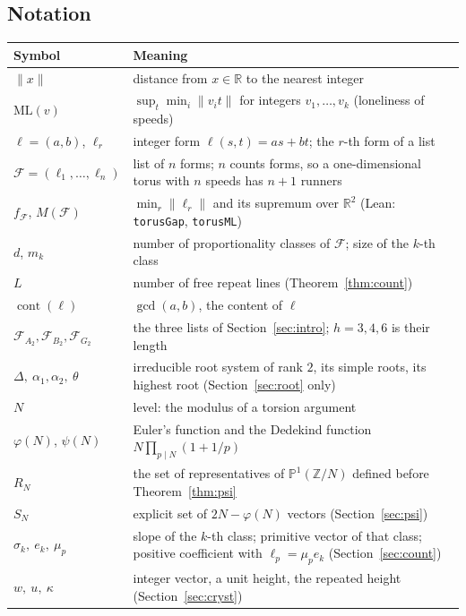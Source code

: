 \documentclass[11pt]{amsart}
\theoremstyle{definition}
\theoremstyle{remark}
\newcommand{\R}{\mathbb{R}}
\newcommand{\Z}{\mathbb{Z}}
\newcommand{\dist}[1]{\lVert #1\rVert}
\newcommand{\ML}{\mathrm{ML}}
\newcommand{\lean}[1]{\texttt{#1}}
\newcommand{\cont}{\operatorname{cont}}
\begin{document}
\subsection{Notation}
\begin{center}
\small
\begin{tabular}{@{}p{3.4cm}p{9cm}@{}}
\toprule
Symbol & Meaning\\
\midrule
$\dist{x}$ & distance from $x\in\R$ to the nearest integer\\
$\ML(v)$ & $\sup_t\min_i\dist{v_it}$ for integers $v_1,\dots,v_k$ (loneliness of speeds)\\
$\ell=(a,b)$, $\ell_r$ & integer form $\ell(s,t)=as+bt$; the $r$-th form of a list\\
$\mathcal F=(\ell_1,\dots,\ell_n)$ & list of $n$ forms; $n$ counts forms, so a one-dimensional torus with $n$ speeds has $n+1$ runners\\
$f_{\mathcal F}$, $M(\mathcal F)$ & $\min_r\dist{\ell_r}$ and its supremum over $\R^2$ (Lean: \lean{torusGap}, \lean{torusML})\\
$d$, $m_k$ & number of proportionality classes of $\mathcal F$; size of the $k$-th class\\
$L$ & number of free repeat lines (Theorem~\ref{thm:count})\\
$\cont(\ell)$ & $\gcd(a,b)$, the content of $\ell$\\
$\mathcal F_{A_2},\mathcal F_{B_2},\mathcal F_{G_2}$ & the three lists of Section~\ref{sec:intro}; $h=3,4,6$ is their length\\
$\Delta,\ \alpha_1,\alpha_2,\ \theta$ & irreducible root system of rank $2$, its simple roots, its highest root (Section~\ref{sec:root} only)\\
$N$ & level: the modulus of a torsion argument\\
$\varphi(N)$, $\psi(N)$ & Euler's function and the Dedekind function $N\prod_{p\mid N}(1+1/p)$\\
$R_N$ & the set of representatives of $\mathbb P^1(\Z/N)$ defined before Theorem~\ref{thm:psi}\\
$S_N$ & explicit set of $2N-\varphi(N)$ vectors (Section~\ref{sec:psi})\\
$\sigma_k,\ e_k,\ \mu_p$ & slope of the $k$-th class; primitive vector of that class; positive coefficient with $\ell_p=\mu_pe_k$ (Section~\ref{sec:count})\\
$w,\ u,\ \kappa$ & integer vector, a unit height, the repeated height (Section~\ref{sec:cryst})\\
\bottomrule
\end{tabular}
\end{center}
\end{document}
